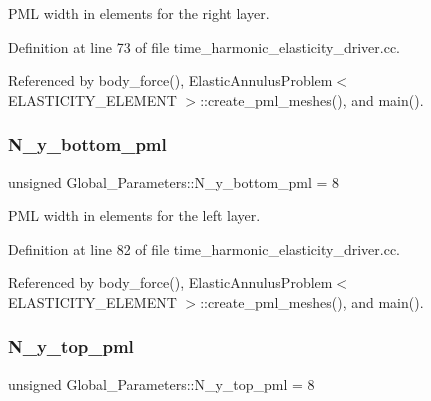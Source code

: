 P\+ML width in elements for the right layer. 



Definition at line 73 of file time\+\_\+harmonic\+\_\+elasticity\+\_\+driver.\+cc.



Referenced by body\+\_\+force(), Elastic\+Annulus\+Problem$<$ E\+L\+A\+S\+T\+I\+C\+I\+T\+Y\+\_\+\+E\+L\+E\+M\+E\+N\+T $>$\+::create\+\_\+pml\+\_\+meshes(), and main().

\mbox{\label{namespaceGlobal__Parameters_a79bff9b8e3435255541b71c0e3cc30a1}} 
\subsubsection{\texorpdfstring{N\+\_\+y\+\_\+bottom\+\_\+pml}{N\_y\_bottom\_pml}}
{\footnotesize\ttfamily unsigned Global\+\_\+\+Parameters\+::\+N\+\_\+y\+\_\+bottom\+\_\+pml = 8}



P\+ML width in elements for the left layer. 



Definition at line 82 of file time\+\_\+harmonic\+\_\+elasticity\+\_\+driver.\+cc.



Referenced by body\+\_\+force(), Elastic\+Annulus\+Problem$<$ E\+L\+A\+S\+T\+I\+C\+I\+T\+Y\+\_\+\+E\+L\+E\+M\+E\+N\+T $>$\+::create\+\_\+pml\+\_\+meshes(), and main().

\mbox{\label{namespaceGlobal__Parameters_ade86fec7e40fc9a5330e6213482f09d6}} 
\subsubsection{\texorpdfstring{N\+\_\+y\+\_\+top\+\_\+pml}{N\_y\_top\_pml}}
{\footnotesize\ttfamily unsigned Global\+\_\+\+Parameters\+::\+N\+\_\+y\+\_\+top\+\_\+pml = 8}



